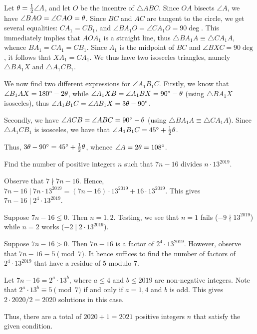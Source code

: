 \begin{solution*}    
    Let $\theta = \frac12 \angle A$, and let $O$ be the incentre of $\triangle ABC$. Since $OA$ bisects $\angle A$, we have $\angle BAO = \angle CAO = \theta$. Since $BC$ and $AC$ are tangent to the circle, we get several equalities: $C A_1 = C B_1$, and $\angle BA_1 O = \angle CA_1O = 90\deg$. This immediately implies that $AOA_1$ is a straight line, thus $\triangle BA_1 A \equiv \triangle CA_1 A$, whence $BA_1 = CA_1 = C B_1$. Since $A_1$ is the midpoint of $BC$ and $\angle BXC = 90\deg$, it follows that $X A_1 = C A_1$. We thus have two isosceles triangles, namely $\triangle BA_1 X$ and $\triangle A_1 C B_1$.
    
    We now find two different expressions for $\angle A_1 B_1 C$. Firstly, we know that $\angle B_1 A X = 180^{\circ} - 2\theta$, while $\angle A_1XB = \angle A_1 B X = 90^{\circ} - \theta$ (using $\triangle B A_1 X$ isosceles), thus $\angle A_1 B_1 C = \angle AB_1 X = 3\theta - 90^{\circ}$.
    
    Secondly, we have $\angle ACB = \angle ABC = 90^{\circ} - \theta$ (using $\triangle BA_1 A \equiv \triangle CA_1 A$). Since $\triangle A_1 C B_1$ is isosceles, we have that $\angle A_1 B_1 C = 45^{\circ} + \frac12 \theta$.
    
    Thus, $3\theta - 90^{\circ} = 45^{\circ} + \frac12 \theta$, whence $\angle A = 2\theta = 108^{\circ}$.
\end{solution*}

\begin{question}[2021]\label{A::2021-O-1-22}
    Find the number of positive integers $n$ such that $7n-16$ divides $n \cdot 13^{2019}$.
\end{question}
\begin{solution*}
    Observe that $7 \nmid 7n - 16$. Hence, $7n-16 \mid 7n \cdot 13^{2019} = (7n-16)\cdot13^{2019} + 16 \cdot 13^{2019}$. This gives $7n - 16 \mid 2^4 \cdot 13^{2019}$.

     Suppose $7n-16 \leq 0$. Then $n = 1, 2$. Testing, we see that $n = 1$ fails ($-9 \nmid 13^{2019}$) while $n = 2$ works ($-2 \mid 2 \cdot 13^{2019}$).
    
     Suppose $7n-16 > 0$. Then $7n-16$ is a factor of $2^4 \cdot 13^{2019}$. However, observe that $7n - 16 \equiv 5 \pmod 7$. It hence suffices to find the number of factors of $2^4 \cdot 13^{2019}$ that have a residue of 5 modulo 7.
    
    Let $7n-16 = 2^a \cdot 13^b$, where $a \leq 4$ and $b \leq 2019$ are non-negative integers. Note that $2^a \cdot 13^b \equiv 5 \pmod{7}$ if and only if $a = 1, 4$ and $b$ is odd. This gives $2 \cdot 2020/2 = 2020$ solutions in this case.
    
    Thus, there are a total of $2020 + 1 = 2021$ positive integers $n$ that satisfy the given condition.
\end{solution*}

